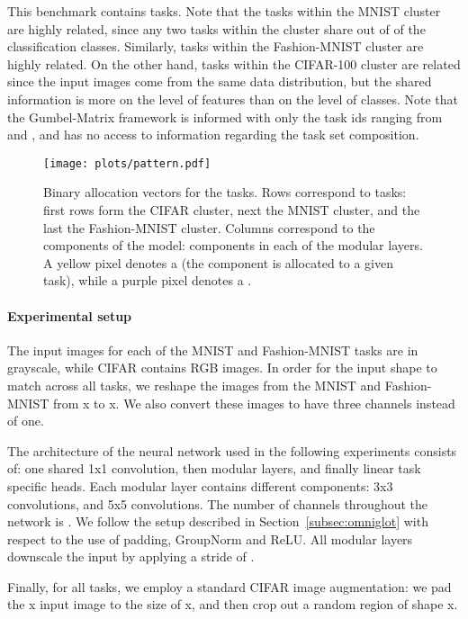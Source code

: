 \documentclass[conference]{IEEEtran}
\begin{document}
This benchmark contains  tasks. Note that the tasks within the MNIST cluster are highly related, since any two tasks within the cluster share  out of  of the classification classes. Similarly, tasks within the Fashion-MNIST cluster are highly related. On the other hand, tasks within the CIFAR-100 cluster are related since the input images come from the same data distribution, but the shared information is more on the level of features than on the level of classes. 
Note that the Gumbel-Matrix framework is informed with only the task ids ranging from  and , and has no access to information regarding the task set composition.

\begin{figure}[t]
\begin{center}
\texttt{[image: plots/pattern.pdf]}
\end{center}
\caption{Binary allocation vectors for the  tasks. Rows correspond to tasks: first  rows form the CIFAR cluster, next  the MNIST cluster, and the last  the Fashion-MNIST cluster. Columns correspond to the  components of the model:  components in each of the  modular layers. A yellow pixel denotes a  (the component is allocated to a given task), while a purple pixel denotes a .}\label{fig:pattern}
\end{figure}

\paragraph{Experimental setup}
The input images for each of the MNIST and Fashion-MNIST tasks are in grayscale, while CIFAR contains RGB images.
In order for the input shape to match across all tasks, we reshape the images from the MNIST and Fashion-MNIST  from x to x. We also convert these images to have three channels instead of one.


The architecture of the neural network used in the following experiments consists of: one shared 1x1 convolution, then  modular layers, and finally linear task specific heads. Each modular layer contains  different components:  3x3 convolutions, and  5x5 convolutions. The number of channels throughout the network is . We follow the setup described in Section~\ref{subsec:omniglot} with respect to the use of padding, GroupNorm and ReLU. All modular layers downscale the input by applying a stride of .

Finally, for all tasks, we employ a standard CIFAR image augmentation: we pad the x input image to the size of x, and then crop out a random region of shape x.
\end{document}
